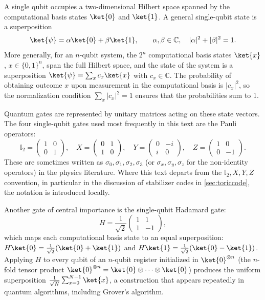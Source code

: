 A single qubit occupies a two-dimensional Hilbert space spanned by the computational basis states $\ket{0}$ and $\ket{1}$. A general single-qubit state is a superposition
\[
    \ket{\psi} = \alpha\ket{0} + \beta\ket{1}, \qquad \alpha, \beta \in \mathbb{C},
    \quad |\alpha|^2 + |\beta|^2 = 1.
\]
More generally, for an $n$-qubit system, the $2^n$ computational basis states $\ket{x}$, $x \in \{0,1\}^n$, span the full Hilbert space, and the state of the system is a superposition $\ket{\psi} = \sum_{x} c_x \ket{x}$ with $c_x \in \mathbb{C}$. The probability of obtaining outcome $x$ upon measurement in the computational basis is $|c_x|^2$, so the normalization condition $\sum_x |c_x|^2 = 1$ ensures that the probabilities sum to 1.

Quantum gates are represented by unitary matrices acting on these state vectors. The four single-qubit gates used most frequently in this text are the Pauli operators:
\[
    \mathbb{I}_2 = \begin{pmatrix} 1 & 0 \\ 0 & 1 \end{pmatrix}, \quad
    X = \begin{pmatrix} 0 & 1 \\ 1 & 0 \end{pmatrix}, \quad
    Y = \begin{pmatrix} 0 & -i \\ i & 0 \end{pmatrix}, \quad
    Z = \begin{pmatrix} 1 & 0 \\ 0 & -1 \end{pmatrix}.
\]
These are sometimes written as $\sigma_0, \sigma_1, \sigma_2, \sigma_3$ (or $\sigma_x, \sigma_y, \sigma_z$ for the non-identity operators) in the physics literature. Where this text departs from the $\mathbb{I}_2, X, Y, Z$ convention, in particular in the discussion of stabilizer codes in \cref{sec:toriccode}, the notation is introduced locally.

Another gate of central importance is the single-qubit Hadamard gate:
\[
    H = \frac{1}{\sqrt{2}}\begin{pmatrix} 1 & 1 \\ 1 & -1 \end{pmatrix},
\]
which maps each computational basis state to an equal superposition: $H\ket{0} = \tfrac{1}{\sqrt{2}}(\ket{0}+\ket{1})$ and $H\ket{1} = \tfrac{1}{\sqrt{2}}(\ket{0}-\ket{1})$. Applying $H$ to every qubit of an $n$-qubit register initialized in $\ket{0}^{\otimes n}$ (the $n$-fold tensor product $\ket{0}^{\otimes n} = \ket{0}\otimes\cdots\otimes\ket{0}$) produces the uniform superposition $\frac{1}{\sqrt{N}}\sum_{x=0}^{N-1}\ket{x}$, a construction that appears repeatedly in quantum algorithms, including Grover's algorithm.